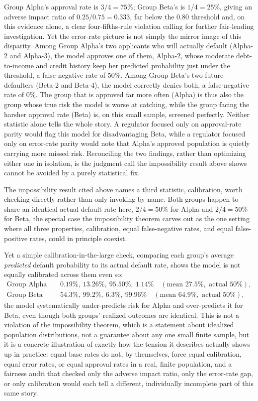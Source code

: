 \documentclass[../ai_in_finance]{subfiles}
\begin{document}
Group Alpha's approval rate is $3/4 = 75\%$; Group Beta's is $1/4 = 25\%$, giving an adverse impact ratio of $0.25/0.75 = 0.333$, far below the 0.80 threshold and, on this evidence alone, a clear four-fifths-rule violation calling for further fair-lending investigation. Yet the error-rate picture is not simply the mirror image of this disparity. Among Group Alpha's two applicants who will actually default (Alpha-2 and Alpha-3), the model approves one of them, Alpha-2, whose moderate debt-to-income and credit history keep her predicted probability just under the threshold, a false-negative rate of $50\%$. Among Group Beta's two future defaulters (Beta-2 and Beta-4), the model correctly denies both, a false-negative rate of $0\%$. The group that is approved far more often (Alpha) is thus also the group whose true risk the model is worse at catching, while the group facing the harsher approval rate (Beta) is, on this small sample, screened perfectly. Neither statistic alone tells the whole story. A regulator focused only on approval-rate parity would flag this model for disadvantaging Beta, while a regulator focused only on error-rate parity would note that Alpha's approved population is quietly carrying more missed risk. Reconciling the two findings, rather than optimizing either one in isolation, is the judgment call the impossibility result above shows cannot be avoided by a purely statistical fix.

The impossibility result cited above names a third statistic, calibration, worth checking directly rather than only invoking by name. Both groups happen to share an identical actual default rate here, $2/4=50\%$ for Alpha and $2/4=50\%$ for Beta, the special case the impossibility theorem carves out as the one setting where all three properties, calibration, equal false-negative rates, and equal false-positive rates, could in principle coexist.

Yet a simple calibration-in-the-large check, comparing each group's average \emph{predicted} default probability to its actual default rate, shows the model is not equally calibrated across them even so:
\begin{align*}
\text{Group Alpha predictions:} &\quad 0.19\%,\ 13.26\%,\ 95.50\%,\ 1.14\% \quad (\text{mean } 27.5\%, \text{ actual } 50\%), \\
\text{Group Beta predictions:} &\quad 54.3\%,\ 99.2\%,\ 6.3\%,\ 99.96\% \quad (\text{mean } 64.9\%, \text{ actual } 50\%),
\end{align*}
the model systematically under-predicts risk for Alpha and over-predicts it for Beta, even though both groups' realized outcomes are identical. This is not a violation of the impossibility theorem, which is a statement about idealized population distributions, not a guarantee about any one small finite sample, but it is a concrete illustration of exactly how the tension it describes actually shows up in practice: equal base rates do not, by themselves, force equal calibration, equal error rates, or equal approval rates in a real, finite population, and a fairness audit that checked only the adverse impact ratio, only the error-rate gap, or only calibration would each tell a different, individually incomplete part of this same story.
\end{document}
